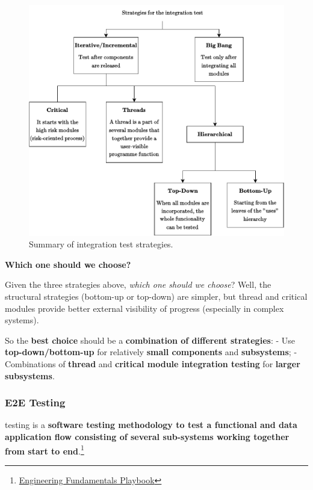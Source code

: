 \begin{figure}[!htp]
    \centering
    \includegraphics[width=\textwidth]{img/strategies-for-the-integration-test.pdf}
    \caption{Summary of integration test strategies.}
    \label{fig: summary of integration test strategies}
\end{figure}

\begin{flushleft}
    \textcolor{Green3}{ \textbf{Which one should we choose?}}
\end{flushleft}
Given the three strategies above, \emph{which one should we choose}? Well, the structural strategies (bottom-up or top-down) are simpler, but thread and critical modules provide better external visibility of progress (especially in complex systems).

\highspace
So the \textbf{best choice} should be a \textbf{combination of different strategies}:
- Use \textbf{top-down/bottom-up} for relatively \textbf{small components} and \textbf{subsystems};
- Combinations of \textbf{thread} and \textbf{critical module integration testing} for \textbf{larger subsystems}.

\newpage

\subsubsection{E2E Testing}

\begin{definitionbox}
     testing is a \textbf{software testing methodology to test a functional and data application flow consisting of several sub-systems working together from start to end}.\footnote{\href{https://microsoft.github.io/code-with-engineering-playbook/automated-testing/e2e-testing/}{Engineering Fundamentals Playbook}}
\end{definitionbox}

